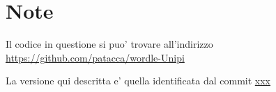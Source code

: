 \section{Note}

Il codice in questione si puo' trovare all'indirizzo \url{https://github.com/patacca/wordle-Unipi}

La versione qui descritta e' quella identificata dal commit \href{https://github.com/patacca/wordle-Unipi/commit/92503786d206f30d17355a57906cdcbb02fddaf3}{xxx}